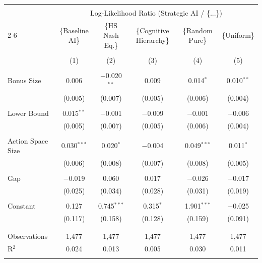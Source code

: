 \begin{tabular}{@{\extracolsep{5pt}}lccccc} 
\\[-1.8ex]\hline 
\hline \\[-1.8ex] 
 & \multicolumn{5}{c}{Log-Likelihood Ratio (Strategic AI / \{...\})} \\ 
\cline{2-6} 
 & \{Baseline AI\} & \{HS Nash Eq.\} & \{Cognitive Hierarchy\} & \{Random Pure\} & \{Uniform\} \\ 
\\[-1.8ex] & (1) & (2) & (3) & (4) & (5)\\ 
\hline \\[-1.8ex] 
 Bonus Size & 0.006 & $-$0.020$^{**}$ & 0.009 & 0.014$^{*}$ & 0.010$^{**}$ \\ 
  & (0.005) & (0.007) & (0.005) & (0.006) & (0.004) \\ 
  & & & & & \\ 
 Lower Bound & 0.015$^{**}$ & $-$0.001 & $-$0.009 & $-$0.001 & $-$0.006 \\ 
  & (0.005) & (0.007) & (0.005) & (0.006) & (0.004) \\ 
  & & & & & \\ 
 Action Space Size & 0.030$^{***}$ & 0.020$^{*}$ & $-$0.004 & 0.049$^{***}$ & 0.011$^{*}$ \\ 
  & (0.006) & (0.008) & (0.007) & (0.008) & (0.005) \\ 
  & & & & & \\ 
 Gap & $-$0.019 & 0.060 & 0.017 & $-$0.026 & $-$0.017 \\ 
  & (0.025) & (0.034) & (0.028) & (0.031) & (0.019) \\ 
  & & & & & \\ 
 Constant & 0.127 & 0.745$^{***}$ & 0.315$^{*}$ & 1.901$^{***}$ & $-$0.025 \\ 
  & (0.117) & (0.158) & (0.128) & (0.159) & (0.091) \\ 
  & & & & & \\ 
\hline \\[-1.8ex] 
Observations & 1,477 & 1,477 & 1,477 & 1,477 & 1,477 \\ 
R$^{2}$ & 0.024 & 0.013 & 0.005 & 0.030 & 0.011 \\ 
\hline 
\hline \\[-1.8ex] 
\end{tabular}
